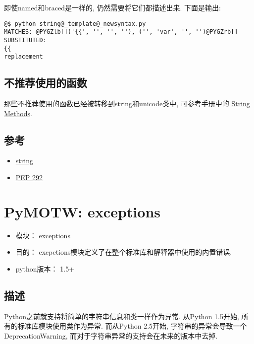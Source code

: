 \documentclass[a4paper,10pt,english]{manual}
\begin{document}
即使named和braced是一样的, 仍然需要将它们都描述出来. 下面是输出:

\begin{Verbatim}[commandchars=@\[\]]
@$ python string@_template@_newsyntax.py
MATCHES: @PYGZlb[]('{{', '', '', ''), ('', 'var', '', '')@PYGZrb[]
SUBSTITUTED:
{{
replacement
\end{Verbatim}


\section{不推荐使用的函数}

那些不推荐使用的函数已经被转移到string和unicode类中, 可参考手册中的 \href{http://docs.python.org/library/stdtypes.html\#string-methods}{String Methods}.


\section{参考}
\begin{itemize}
\item {} 
\href{http://docs.python.org/library/string.html}{string}

\item {} 
\href{http://www.python.org/peps/pep-0292.html}{PEP 292}

\end{itemize}

\resetcurrentobjects


\chapter{PyMOTW: exceptions}
\begin{itemize}
\item {} 
模块： exceptions

\item {} 
目的： excpetions模块定义了在整个标准库和解释器中使用的内置错误.

\item {} 
python版本： 1.5+

\end{itemize}


\section{描述}

Python之前就支持将简单的字符串信息和类一样作为异常. 从Python 1.5开始, 所有的标准库模块使用类作为异常. 而从Python 2.5开始, 字符串的异常会导致一个DeprecationWarning, 而对于字符串异常的支持会在未来的版本中去掉.
\end{document}
